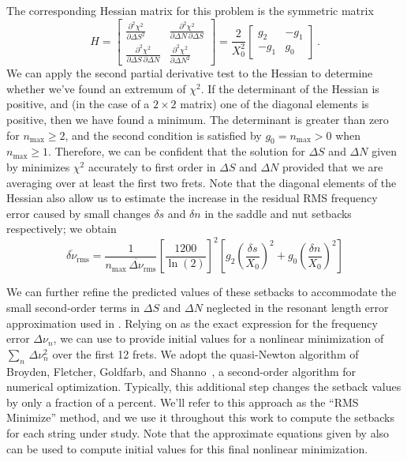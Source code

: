 The corresponding Hessian matrix for this problem is the symmetric matrix
 \begin{equation}
H = \begin{bmatrix}
      \frac{\partial^2 \chi^2}{\partial \Delta S^2} & \frac{\partial^2 \chi^2}{\partial \Delta N\, \partial \Delta S} \\
      \frac{\partial^2 \chi^2}{\partial \Delta S\, \partial \Delta N} & \frac{\partial^2 \chi^2}{\partial \Delta N^2}
    \end{bmatrix}
  = \frac{2}{X_0^2} \begin{bmatrix}
      g_2 & -g_1 \\
      -g_1 & g_0
    \end{bmatrix}\, .
 \end{equation}
We can apply the second partial derivative test to the Hessian to determine whether we've found an extremum of $\chi^2$. If the determinant of the Hessian is positive, and (in the case of a $2 \times 2$ matrix) one of the diagonal elements is positive, then we have found a minimum. The determinant is greater than zero for $n_\text{max} \ge 2$, and the second condition is satisfied by $g_0 = n_\text{max} > 0$ when $n_\text{max} \ge 1$. Therefore, we can be confident that the solution for $\Delta S$ and $\Delta N$ given by  minimizes $\chi^2$ accurately to first order in $\Delta S$ and $\Delta N$ provided that we are averaging over at least the first two frets. Note that the diagonal elements of the Hessian also allow us to estimate the increase in the residual RMS frequency error caused by small changes $\delta s$ and $\delta n$ in the saddle and nut setbacks respectively; we obtain
\begin{equation}
  \overline{\delta \nu}_\text{rms} = \frac{1}{n_\text{max}\, \overline{\Delta \nu}_\text{rms}} \left[ \frac{1200}{\ln(2)} \right]^2 \left[ g_2 \left(\frac{\delta s}{X_0}\right)^2 + g_0 \left(\frac{\delta n}{X_0}\right)^2\right]
\end{equation}

We can further refine the predicted values of these setbacks to accommodate the small second-order terms in $\Delta S$ and $\Delta N$ neglected in the resonant length error approximation used in . Relying on  as the exact expression for the frequency error $\Delta \nu_n$, we can use  to provide initial values for a nonlinear minimization of $\sum_n\, \Delta \nu_n^2$ over the first 12 frets. We adopt the quasi-Newton algorithm of Broyden, Fletcher, Goldfarb, and Shanno~\cite{ref:nocedal2006no}, a second-order algorithm for numerical optimization. Typically, this additional step changes the setback values by only a fraction of a percent. We'll refer to this approach as the ``RMS Minimize'' method, and we use it throughout this work to compute the setbacks for each string under study. Note that the approximate equations given by  also can be used to compute initial values for this final nonlinear minimization.

